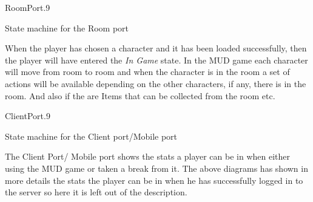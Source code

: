 \begin{myfigure}{RoomPort}{.9}%
	\caption{State machine for the Room port}
	\label{fig:room-port}
\end{myfigure}

When the player has chosen a character and it has been loaded successfully, then the player will have entered the \emph{In Game} state. In the MUD game each character will move from room to room and when the character is in the room a set of actions will be available depending on the other characters, if any, there is in the room. And also if the are Items that can be collected from the room etc. 

\begin{myfigure}{ClientPort}{.9}%
	\caption{State machine for the Client port/Mobile port}
	\label{fig:client-port}
\end{myfigure}

The Client Port/ Mobile port shows the stats a player can be in when either using the MUD game or taken a break from it. The above diagrams has shown in more details the stats the player can be in when he has successfully logged in to the server so here it is left out of the description. 
